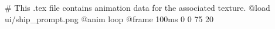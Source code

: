 # This .tex file contains animation data for the associated texture.
@load ui/ship_prompt.png
@anim loop
	@frame 100ms 0 0 75 20